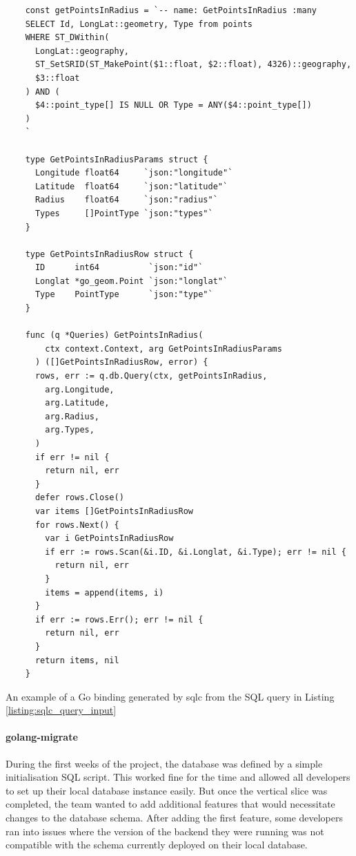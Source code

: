 \begin{listing}[htbp]
  \centering{}
  \begin{minipage}{0.85\textwidth}
  \begin{verbatim}
    const getPointsInRadius = `-- name: GetPointsInRadius :many
    SELECT Id, LongLat::geometry, Type from points
    WHERE ST_DWithin(
      LongLat::geography,
      ST_SetSRID(ST_MakePoint($1::float, $2::float), 4326)::geography,
      $3::float
    ) AND (
      $4::point_type[] IS NULL OR Type = ANY($4::point_type[])
    )
    `

    type GetPointsInRadiusParams struct {
      Longitude float64     `json:"longitude"`
      Latitude  float64     `json:"latitude"`
      Radius    float64     `json:"radius"`
      Types     []PointType `json:"types"`
    }

    type GetPointsInRadiusRow struct {
      ID      int64          `json:"id"`
      Longlat *go_geom.Point `json:"longlat"`
      Type    PointType      `json:"type"`
    }

    func (q *Queries) GetPointsInRadius(
        ctx context.Context, arg GetPointsInRadiusParams
      ) ([]GetPointsInRadiusRow, error) {
      rows, err := q.db.Query(ctx, getPointsInRadius,
        arg.Longitude,
        arg.Latitude,
        arg.Radius,
        arg.Types,
      )
      if err != nil {
        return nil, err
      }
      defer rows.Close()
      var items []GetPointsInRadiusRow
      for rows.Next() {
        var i GetPointsInRadiusRow
        if err := rows.Scan(&i.ID, &i.Longlat, &i.Type); err != nil {
          return nil, err
        }
        items = append(items, i)
      }
      if err := rows.Err(); err != nil {
        return nil, err
      }
      return items, nil
    }
  \end{verbatim}
  \end{minipage}
  \caption{An example of a Go binding generated by sqlc from the SQL query in
  Listing \ref{listing:sqlc_query_input}}
  \label{listing:sqlc_generated_bindings}
\end{listing}


\paragraph{golang-migrate}

During the first weeks of the project, the database was defined by a simple
initialisation SQL script. This worked fine for the time and allowed all
developers to set up their local database instance easily. But once the vertical
slice was completed, the team wanted to add additional features that would
necessitate changes to the database schema. After adding the first feature, some
developers ran into issues where the version of the backend they were running
was not compatible with the schema currently deployed on their local database.

